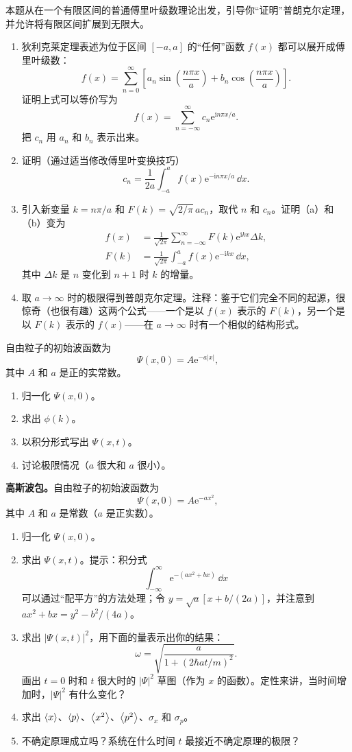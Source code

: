 本题从在一个有限区间的普通傅里叶级数理论出发，引导你“证明”普朗克尔定理，并允许将有限区间扩展到无限大。
\begin{enumerate}
\item 狄利克莱定理表述为位于区间 $[-a,a]$ 的“任何”函数 $f(x)$ 都可以展开成傅里叶级数：
\[
f(x)=\sum_{n=0}^{\infty}\left[a_n\sin\left(\frac{n\pi x}{a}\right)
+b_n\cos\left(\frac{n\pi x}{a}\right)\right].
\]
证明上式可以等价写为
\[
f(x)=\sum_{n=-\infty}^{\infty}c_n\mathrm{e}^{\mathrm{i}n\pi x/a}.
\]
把 $c_n$ 用 $a_n$ 和 $b_n$ 表示出来。
\item 证明（通过适当修改傅里叶变换技巧）
\[
c_n=\frac{1}{2a}\int_{-a}^{a}f(x)\mathrm{e}^{-\mathrm{i}n\pi x/a}\,\dd x.
\]
\item 引入新变量 $k=n\pi/a$ 和 $F(k)=\sqrt{2/\pi}\,a c_n$，取代 $n$ 和 $c_n$。证明（a）和（b）变为
\begin{align*}
f(x)&=\frac{1}{\sqrt{2\pi}}\sum_{n=-\infty}^{\infty}F(k)\mathrm{e}^{\mathrm{i}kx}\Delta k,\\
F(k)&=\frac{1}{\sqrt{2\pi}}\int_{-a}^{a}f(x)\mathrm{e}^{-\mathrm{i}kx}\,\dd x,
\end{align*}
其中 $\Delta k$ 是 $n$ 变化到 $n+1$ 时 $k$ 的增量。
\item 取 $a\to\infty$ 时的极限得到普朗克尔定理。注释：鉴于它们完全不同的起源，很惊奇（也很有趣）这两个公式——一个是以 $f(x)$ 表示的 $F(k)$，另一个是以 $F(k)$ 表示的 $f(x)$——在 $a\to\infty$ 时有一个相似的结构形式。
\end{enumerate}
\vfill

自由粒子的初始波函数为
\[
\Psi(x,0)=A\mathrm{e}^{-a|x|},
\]
其中 $A$ 和 $a$ 是正的实常数。
\begin{enumerate}
\item 归一化 $\Psi(x,0)$。
\item 求出 $\phi(k)$。
\item 以积分形式写出 $\Psi(x,t)$。
\item 讨论极限情况（$a$ 很大和 $a$ 很小）。
\end{enumerate}
\vfill

\textbf{高斯波包。}自由粒子的初始波函数为
\[
\Psi(x,0)=A\mathrm{e}^{-ax^2},
\]
其中 $A$ 和 $a$ 是常数（$a$ 是正实数）。
\begin{enumerate}
\item 归一化 $\Psi(x,0)$。
\item 求出 $\Psi(x,t)$。提示：积分式
\[
\int_{-\infty}^{\infty}\mathrm{e}^{-(ax^2+bx)}\,\dd x
\]
可以通过“配平方”的方法处理；令 $y=\sqrt{a}[x+b/(2a)]$，并注意到 $ax^2+bx=y^2-b^2/(4a)$。
\item 求出 $|\Psi(x,t)|^2$，用下面的量表示出你的结果：
\[
\omega=\sqrt{\frac{a}{1+(2\hbar at/m)^2}}.
\]
画出 $t=0$ 时和 $t$ 很大时的 $|\Psi|^2$ 草图（作为 $x$ 的函数）。定性来讲，当时间增加时，$|\Psi|^2$ 有什么变化？
\item 求出 $\left\langle x\right\rangle$、$\left\langle p\right\rangle$、$\left\langle x^2\right\rangle$、$\left\langle p^2\right\rangle$、$\sigma_x$ 和 $\sigma_p$。
\item 不确定原理成立吗？系统在什么时间 $t$ 最接近不确定原理的极限？
\end{enumerate}
\vfill

